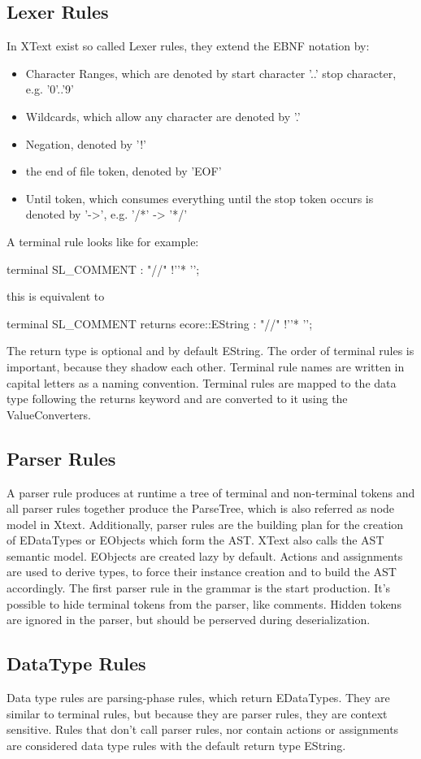 \subsection{Lexer Rules}
In XText exist so called Lexer rules,  they extend the EBNF notation by:
\begin{itemize}
	\item Character Ranges, which are denoted by start character '..' stop character, e.g. '0'..'9' 
	\item Wildcards, which allow any character are denoted by '.'
	\item Negation, denoted by '!'
	\item the end of file token, denoted by 'EOF'
	\item Until token, which consumes everything until the stop token occurs is denoted by '->', e.g. '/*' -> '*/'
\end{itemize}
A terminal rule looks like for example:
\begin{xtxt}
terminal SL_COMMENT : "//" !'\n'* '\n';
\end{xtxt}
this is equivalent to 
\begin{xtxt}
terminal SL_COMMENT returns ecore::EString : "//" !'\n'* '\n';
\end{xtxt}
The return type is optional and by default EString. The order of terminal rules is important, because they shadow each other. Terminal rule names are written in capital letters as a naming convention. Terminal rules are mapped to the data type following the returns keyword and are converted to it using the ValueConverters.

\subsection{Parser Rules}
A parser rule produces at runtime a tree of terminal and non-terminal tokens and all parser rules together produce the ParseTree, which is also referred as node model in Xtext. Additionally, parser rules are the building plan for the creation of EDataTypes or EObjects which form the AST. XText also calls the AST semantic model. EObjects are created lazy by default. Actions and assignments are used to derive types, to force their instance creation and to build the AST accordingly. The first parser rule in the grammar is the start production. It's possible to hide terminal tokens from the parser, like comments. Hidden tokens are ignored in the parser, but should be perserved during deserialization.

\subsection{DataType Rules}
Data type rules are parsing-phase rules, which return EDataTypes. They are similar to terminal rules, but because they are parser rules, they are context sensitive. Rules that don't call parser rules, nor contain actions or assignments are considered data type rules with the default return type EString. 
\begin{xtxt}
Number returns ecore::EInt : NUM ('.' NUM*)?;}
\end{xtxt}

